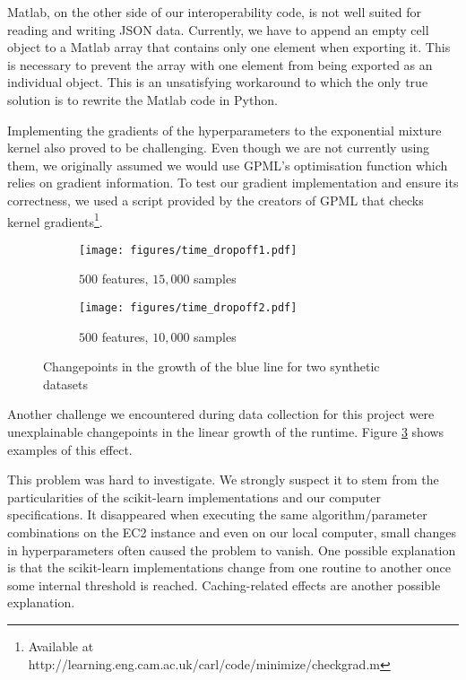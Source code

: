 \documentclass[a4paper,12pt,twoside,openright]{report}
\begin{document}
Matlab, on the other side of our interoperability code, is not well suited for reading and writing JSON data. Currently, we have to append an empty cell object to a Matlab array that contains only one element when exporting it. This is necessary to prevent the array with one element from being exported as an individual object. This is an unsatisfying workaround to which the only true solution is to rewrite the Matlab code in Python.

Implementing the gradients of the hyperparameters to the exponential mixture kernel also proved to be challenging. Even though we are not currently using them, we originally assumed we would use GPML's optimisation function which relies on gradient information. To test our gradient implementation and ensure its correctness, we used a script provided by the creators of GPML that checks kernel gradients\footnote{Available at http://learning.eng.cam.ac.uk/carl/code/minimize/checkgrad.m}.

\begin{figure}[t]
\centering
\begin{subfigure}{.45\textwidth}
  \centering
  \texttt{[image: figures/time\_dropoff1.pdf]}
  \caption{$500$ features, $15,000$ samples}
  \label{time_dropoff1}
\end{subfigure}%
\begin{subfigure}{.45\textwidth}
  \centering
  \texttt{[image: figures/time\_dropoff2.pdf]}
  \caption{$500$ features, $10,000$ samples}
  \label{time_dropoff2}
\end{subfigure}
\caption{Changepoints in the growth of the blue line for two synthetic datasets}
\label{time_hinge}
\end{figure}

Another challenge we encountered during data collection for this project were unexplainable changepoints in the linear growth of the runtime. Figure \ref{time_hinge} shows examples of this effect.

This problem was hard to investigate. We strongly suspect it to stem from the particularities of the scikit-learn implementations and our computer specifications. It disappeared when executing the same algorithm/parameter combinations on the EC2 instance and even on our local computer, small changes in hyperparameters often caused the problem to vanish. One possible explanation is that the scikit-learn implementations change from one routine to another once some internal threshold is reached. Caching-related effects are another possible explanation.
\end{document}
